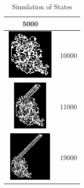 \begin{table}[!ht]
\begin{center}
\begin{tabular}{ | c | c | }
				5000 \\ \hline
			\includegraphics[width=25mm, height=25mm]{question_4/Iteration-10000.eps} &
				10000 \\ \hline
			\includegraphics[width=25mm, height=25mm]{question_4/Iteration-11000.eps} &
				11000 \\ \hline
			\includegraphics[width=25mm, height=25mm]{question_4/Iteration-19000.eps} &
				19000 \\ \hline
		\end{tabular}
	\end{center}
\caption{Simulation of States}
\end{table}


